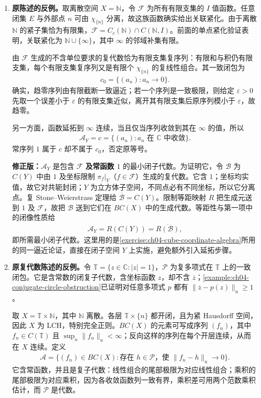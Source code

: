 \documentclass[../../main.tex]{subfiles}
\begin{document}
\begin{solution}
\begin{enumerate}
\item \textbf{原陈述的反例。}取离散空间 $X=\mathbb N$，令 $\mathcal F$ 为所有有限支集的 $I$ 值函数。任意闭集 $E$ 与外部点 $n$ 可由 $\chi_{\{n\}}$ 分离，故这族函数确实给出关联紧化。由于离散 $\mathbb N$ 的紧子集恰为有限集，$\mathcal F=C_c(\mathbb N)\cap C(\mathbb N,I)$。前面的单点紧化验证表明，关联紧化为 $\mathbb N\cup\{\infty\}$，其中 $\infty$ 的邻域补集有限。

由 $\mathcal F$ 生成的不含单位要求的复代数恰为有限支集复序列：有限和与积仍有限支集，每个有限支集复序列又是有限个 $\chi_{\{n\}}$ 的复线性组合。其一致闭包为
\begin{align*}
c_0=\{(a_n):a_n\to0\}.
\end{align*}
确实，趋零序列由有限截断一致逼近；若一个序列是一致极限，则给定 $\varepsilon>0$ 先取一个误差小于 $\varepsilon$ 的有限支集近似，离开其有限支集后原序列模小于 $\varepsilon$，故趋零。

另一方面，函数延拓到 $\infty$ 连续，当且仅当序列收敛到其在 $\infty$ 的值，所以
\begin{align*}
\mathcal A_Y=c=\{(a_n):a_n\text{ 在 }\mathbb C\text{ 中收敛}\}.
\end{align*}
常序列 $1$ 属于 $c$ 却不属于 $c_0$，否定原等号。

\textbf{修正版：}$\mathcal A_Y$ 是包含 $\mathcal F$ \textbf{及常函数 $1$} 的最小闭子代数。为证明它，令 $\mathcal B$ 为 $C(Y)$ 中由 $1$ 及坐标限制 $\pi_f|_Y$（$f\in\mathcal F$）生成的复代数。它含 $1$；坐标均实值，故它对共轭封闭；$Y$ 为立方体子空间，不同点必有不同坐标，所以它分离点。复 Stone--Weierstrass 定理给 $\overline{\mathcal B}=C(Y)$。限制等距映射 $R$ 把生成元送到 $1$ 及 $\mathcal F$，故把 $\mathcal B$ 送到它们在 $BC(X)$ 中的生成代数。等距性与第一项中的闭像性质给
\begin{align*}
\mathcal A_Y=R(C(Y))=\overline{R(\mathcal B)},
\end{align*}
即所需最小闭子代数。这里用的是\cref{exercise:ch04-cube-coordinate-algebra}所用的同一逼近论证，直接在闭子空间 $Y$ 上实施，避免额外引入延拓步骤。

\item \textbf{原复代数陈述的反例。}令 $\mathbb T=\{z\in\mathbb C:|z|=1\}$，$\mathcal P$ 为复多项式在 $\mathbb T$ 上的一致闭包。它是含常数的闭复子代数，含坐标函数 $z$，却不含 $\overline z$；\cref{example:ch04-conjugate-circle-obstruction}已证明对任意多项式 $p$ 都有 $\|\overline z-p(z)\|_u\ge1$。

取 $X=\mathbb T\times\mathbb N$，其中 $\mathbb N$ 离散。各层 $\mathbb T\times\{n\}$ 都开闭，且为紧 Hausdorff 空间，因此 $X$ 为 LCH，特别完全正则。$BC(X)$ 的元素可写成序列 $(f_n)$，其中 $f_n\in C(\mathbb T)$ 且 $\sup_n\|f_n\|_u<\infty$；反向这样的序列在每个开层连续，从而在 $X$ 连续。定义
\begin{align*}
\mathcal A=\{(f_n)\in BC(X):
\text{存在 }h\in\mathcal P\text{，使 }\|f_n-h\|_u\to0\}.
\end{align*}
它含常函数，并且是复子代数：线性组合的尾部极限为对应线性组合；乘积的尾部极限为对应乘积，因为各收敛函数列一致有界，乘积差可用两个范数乘积估计，而 $\mathcal P$ 是代数。


\end{enumerate}
\end{solution}
\end{document}

